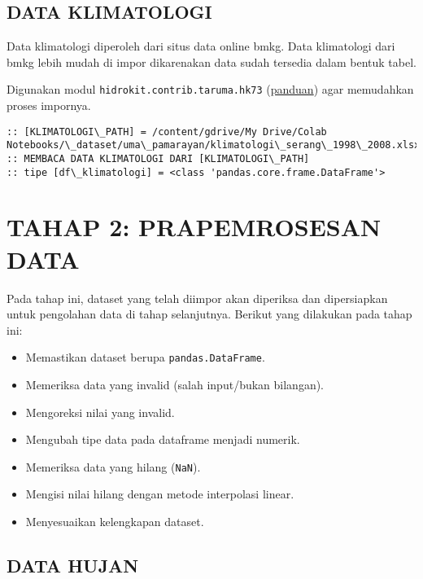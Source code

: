\documentclass[11pt]{article}
\providecommand{\tightlist}{%
      \setlength{\itemsep}{0pt}\setlength{\parskip}{0pt}}
\begin{document}
    \hypertarget{data-klimatologi}{%
\subsection{DATA KLIMATOLOGI}\label{data-klimatologi}}

Data klimatologi diperoleh dari situs data online bmkg. Data klimatologi
dari bmkg lebih mudah di impor dikarenakan data sudah tersedia dalam
bentuk tabel.

Digunakan modul \texttt{hidrokit.contrib.taruma.hk73}
(\href{https://nbviewer.jupyter.org/gist/taruma/b00880905f297013f046dad95dc2e284}{panduan})
agar memudahkan proses impornya.

    \begin{Verbatim}[commandchars=\\\{\}]
:: [KLIMATOLOGI\_PATH] = /content/gdrive/My Drive/Colab
Notebooks/\_dataset/uma\_pamarayan/klimatologi\_serang\_1998\_2008.xlsx
:: MEMBACA DATA KLIMATOLOGI DARI [KLIMATOLOGI\_PATH]
:: tipe [df\_klimatologi] = <class 'pandas.core.frame.DataFrame'>
    \end{Verbatim}

    \hypertarget{tahap-2-prapemrosesan-data}{%
\section{TAHAP 2: PRAPEMROSESAN DATA}\label{tahap-2-prapemrosesan-data}}

Pada tahap ini, dataset yang telah diimpor akan diperiksa dan
dipersiapkan untuk pengolahan data di tahap selanjutnya. Berikut yang
dilakukan pada tahap ini:

\begin{itemize}
\tightlist
\item
  Memastikan dataset berupa \texttt{pandas.DataFrame}.
\item
  Memeriksa data yang invalid (salah input/bukan bilangan).
\item
  Mengoreksi nilai yang invalid.
\item
  Mengubah tipe data pada dataframe menjadi numerik.
\item
  Memeriksa data yang hilang (\texttt{NaN}).
\item
  Mengisi nilai hilang dengan metode interpolasi linear.
\item
  Menyesuaikan kelengkapan dataset.
\end{itemize}

    \hypertarget{data-hujan}{%
\subsection{DATA HUJAN}\label{data-hujan}}
\end{document}
